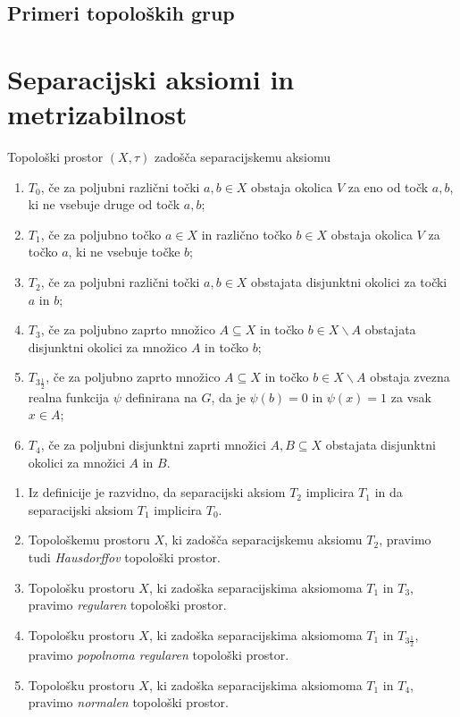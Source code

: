 \documentclass[mat1]{fmfdelo}
\begin{document}
\subsection{Primeri topoloških grup}


\section{Separacijski aksiomi in metrizabilnost}

\begin{definicija}\label{def:sepaks}
Topološki prostor $(X, \tau)$ zadošča separacijskemu aksiomu
\begin{enumerate}
\item $T_0$, če za poljubni različni točki $a, b \in X$ obstaja okolica $V$ za eno od točk $a, b$, ki ne vsebuje druge od točk $a, b$;
\item $T_1$, če za poljubno točko $a \in X$ in različno točko $b \in X$ obstaja okolica $V$ za točko $a$, ki ne vsebuje točke $b$;
\item $T_2$, če za poljubni različni točki $a, b \in X$ obstajata disjunktni okolici za točki $a$ in $b$;
\item $T_3$, če za poljubno zaprto množico $A \subseteq X$ in točko $b \in X\backslash A$ obstajata disjunktni okolici za množico $A$ in točko $b$;
\item $T_{3 \frac{1}{2}}$, če za poljubno zaprto množico $A \subseteq X$ in točko $b \in X\backslash A$ obstaja zvezna realna funkcija $\psi$ definirana na $G$, da je $\psi (b) = 0$ in $\psi (x) = 1$ za vsak $x \in A$;
\item $T_4$, če za poljubni disjunktni zaprti množici $A, B \subseteq X$ obstajata disjunktni okolici za množici $A$ in $B$.
\end{enumerate}
\end{definicija}

\begin{opomba}
\begin{enumerate}
\item Iz definicije je razvidno, da separacijski aksiom $T_2$ implicira $T_1$ in da separacijski aksiom $T_1$ implicira $T_0$.
\item Topološkemu prostoru $X$, ki zadošča separacijskemu aksiomu $T_2$, pravimo tudi \emph{Hausdorffov} topološki prostor.
\item Topološku prostoru $X$, ki zadoška separacijskima aksiomoma $T_1$ in $T_3$, pravimo \emph{regularen} topološki prostor.
\item Topološku prostoru $X$, ki zadoška separacijskima aksiomoma $T_1$ in $T_{3 \frac{1}{2}}$, pravimo \emph{popolnoma regularen} topološki prostor.
\item Topološku prostoru $X$, ki zadoška separacijskima aksiomoma $T_1$ in $T_4$, pravimo \emph{normalen} topološki prostor.
\end{enumerate}
\end{opomba}
\end{document}
